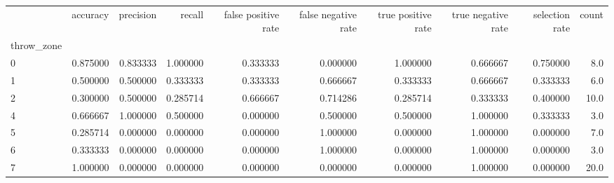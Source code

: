 \begin{tabular}{lrrrrrrrrr}
\toprule
{} &  accuracy &  precision &    recall &  false positive rate &  false negative rate &  true positive rate &  true negative rate &  selection rate &  count \\
throw\_zone &           &            &           &                      &                      &                     &                     &                 &        \\
\midrule
0          &  0.875000 &   0.833333 &  1.000000 &             0.333333 &             0.000000 &            1.000000 &            0.666667 &        0.750000 &    8.0 \\
1          &  0.500000 &   0.500000 &  0.333333 &             0.333333 &             0.666667 &            0.333333 &            0.666667 &        0.333333 &    6.0 \\
2          &  0.300000 &   0.500000 &  0.285714 &             0.666667 &             0.714286 &            0.285714 &            0.333333 &        0.400000 &   10.0 \\
4          &  0.666667 &   1.000000 &  0.500000 &             0.000000 &             0.500000 &            0.500000 &            1.000000 &        0.333333 &    3.0 \\
5          &  0.285714 &   0.000000 &  0.000000 &             0.000000 &             1.000000 &            0.000000 &            1.000000 &        0.000000 &    7.0 \\
6          &  0.333333 &   0.000000 &  0.000000 &             0.000000 &             1.000000 &            0.000000 &            1.000000 &        0.000000 &    3.0 \\
7          &  1.000000 &   0.000000 &  0.000000 &             0.000000 &             0.000000 &            0.000000 &            1.000000 &        0.000000 &   20.0 \\
\bottomrule
\end{tabular}
